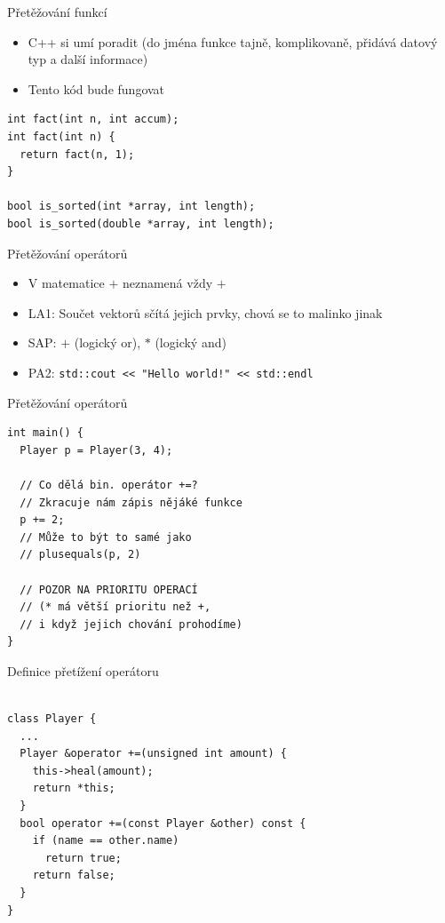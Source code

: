 \documentclass[aspectratio=1610]{beamer}
\begin{document}
\begin{frame}[fragile]{Přetěžování funkcí}

\begin{itemize}
  \item C++ si umí poradit (do jména funkce tajně, komplikovaně, přidává datový typ a další informace)
  \item Tento kód bude fungovat
\end{itemize}

\begin{verbatim}
int fact(int n, int accum);
int fact(int n) {
  return fact(n, 1);
}

bool is_sorted(int *array, int length);
bool is_sorted(double *array, int length);
\end{verbatim}

\end{frame}

\begin{frame}{Přetěžování operátorů}

\begin{itemize}
  \item V matematice $+$ neznamená vždy $+$
  \item LA1: Součet vektorů sčítá jejich prvky, chová se to malinko jinak
  \item SAP: $+$ (logický or), $*$ (logický and)
  \item PA2: \texttt{std::cout << "Hello world!" << std::endl}
\end{itemize}

\end{frame}

\begin{frame}[fragile]{Přetěžování operátorů}

\begin{verbatim}
int main() {
  Player p = Player(3, 4);

  // Co dělá bin. operátor +=?
  // Zkracuje nám zápis nějáké funkce
  p += 2;
  // Může to být to samé jako
  // plusequals(p, 2)

  // POZOR NA PRIORITU OPERACÍ
  // (* má větší prioritu než +,
  // i když jejich chování prohodíme)
}
\end{verbatim}

\end{frame}

\begin{frame}[fragile]{Definice přetížení operátoru}

\begin{verbatim}

class Player {
  ...
  Player &operator +=(unsigned int amount) {
    this->heal(amount);
    return *this;
  }
  bool operator +=(const Player &other) const {
    if (name == other.name)
      return true;
    return false;
  }
}

\end{verbatim}

\end{frame}
\end{document}
